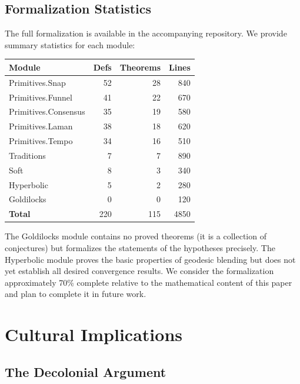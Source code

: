\documentclass[cmj]{article}
\begin{document}
\subsection{Formalization Statistics}

The full formalization is available in the accompanying repository. We provide
summary statistics for each module:

\begin{center}
\begin{tabular}{lrrr}
\toprule
\textbf{Module} & \textbf{Defs} & \textbf{Theorems} & \textbf{Lines} \\
\midrule
Primitives.Snap    & 52  & 28  & 840  \\
Primitives.Funnel  & 41  & 22  & 670  \\
Primitives.Consensus & 35 & 19  & 580  \\
Primitives.Laman   & 38  & 18  & 620  \\
Primitives.Tempo   & 34  & 16  & 510  \\
Traditions         & 7   & 7   & 890  \\
Soft               & 8   & 3   & 340  \\
Hyperbolic         & 5   & 2   & 280  \\
Goldilocks         & 0   & 0   & 120  \\
\midrule
\textbf{Total}     & 220 & 115 & 4850 \\
\bottomrule
\end{tabular}
\end{center}

The Goldilocks module contains no proved theorems (it is a collection of
conjectures) but formalizes the statements of the hypotheses precisely. The
Hyperbolic module proves the basic properties of geodesic blending but does
not yet establish all desired convergence results. We consider the
formalization approximately 70\% complete relative to the mathematical content
of this paper and plan to complete it in future work.

\section{Cultural Implications}
\label{sec:cultural}

\subsection{The Decolonial Argument}
\end{document}
